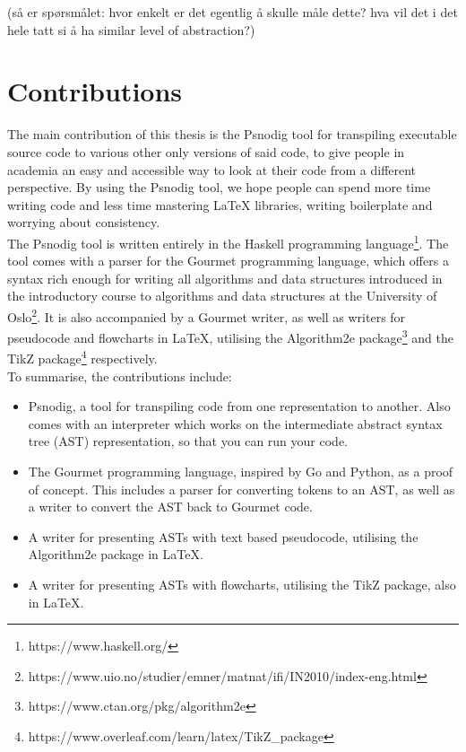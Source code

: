 (så er spørsmålet: hvor enkelt er det egentlig å skulle måle dette? hva vil det i det hele tatt si å ha similar level of abstraction?)

\section{Contributions}

The main contribution of this thesis is the Psnodig tool for transpiling executable source code to various other only versions of said code, to give people in academia an easy and accessible way to look at their code from a different perspective. By using the Psnodig tool, we hope people can spend more time writing code and less time mastering LaTeX libraries, writing boilerplate and worrying about consistency. \hfill \\

The Psnodig tool is written entirely in the Haskell programming language\footnote{https://www.haskell.org/}. The tool comes with a parser for the Gourmet programming language, which offers a syntax rich enough for writing all algorithms and data structures introduced in the introductory course to algorithms and data structures at the University of Oslo\footnote{https://www.uio.no/studier/emner/matnat/ifi/IN2010/index-eng.html}. It is also accompanied by a Gourmet writer, as well as writers for pseudocode and flowcharts in LaTeX, utilising the Algorithm2e package\footnote{https://www.ctan.org/pkg/algorithm2e} and the TikZ package\footnote{https://www.overleaf.com/learn/latex/TikZ\_package} respectively. \hfill \\

To summarise, the contributions include:
\begin{itemize}
    \item Psnodig, a tool for transpiling code from one representation to another. Also comes with an interpreter which works on the intermediate abstract syntax tree (AST) representation, so that you can run your code.
    \item The Gourmet programming language, inspired by Go and Python, as a proof of concept. This includes a parser for converting tokens to an AST, as well as a writer to convert the AST back to Gourmet code.
    \item A writer for presenting ASTs with text based pseudocode, utilising the Algorithm2e package in LaTeX.
    \item A writer for presenting ASTs with flowcharts, utilising the TikZ package, also in LaTeX.
\end{itemize}

